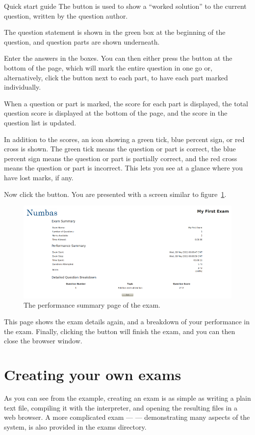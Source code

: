 \begin{chapter}{\label{cha:quickstart}Quick start guide}
  The  button is used to show a ``worked solution'' to the
  current question, written by the question author.

  The question statement is shown in the green box at the beginning of the
  question, and question parts are shown underneath.

  Enter the answers in the boxes.  You can then either press the
   button at the bottom of the page, which will
  mark the entire question in one go or, alternatively, click the
   button next to each part, to have each part marked
  individually.
  
  When a question or part is marked, the score for each part is displayed, the
  total question score is displayed at the bottom of the page, and the score in
  the question list is updated.

  In addition to the scores, an icon showing a green tick, blue percent sign,
  or red cross is shown.  The green tick means the question or part is correct,
  the blue percent sign means the question or part is partially correct, and
  the red cross means the question or part is incorrect.  This lets you see at
  a glance where you have lost marks, if any.

  Now click the  button.  You are presented with a screen
  similar to figure~\ref{fig:example_screen3}.
  \begin{figure}[ht]
    \centering
    \includegraphics[scale=0.5]{fig/example_screen3}
    \caption{\label{fig:example_screen3}
      The performance summary page of the exam.
    }
  \end{figure}
  This page shows the exam details again, and a breakdown of your performance
  in the exam.  Finally, clicking the  button will finish the
  exam, and you can then close the browser window.

  \section{Creating your own exams}
  As you can see from the example, creating an exam is as simple as writing a
  plain text file, compiling it with the  interpreter,
  and opening the resulting files in a web browser.  A more complicated exam
  ---  --- demonstrating many aspects of the system,
  is also provided in the exams directory.


\end{chapter}
